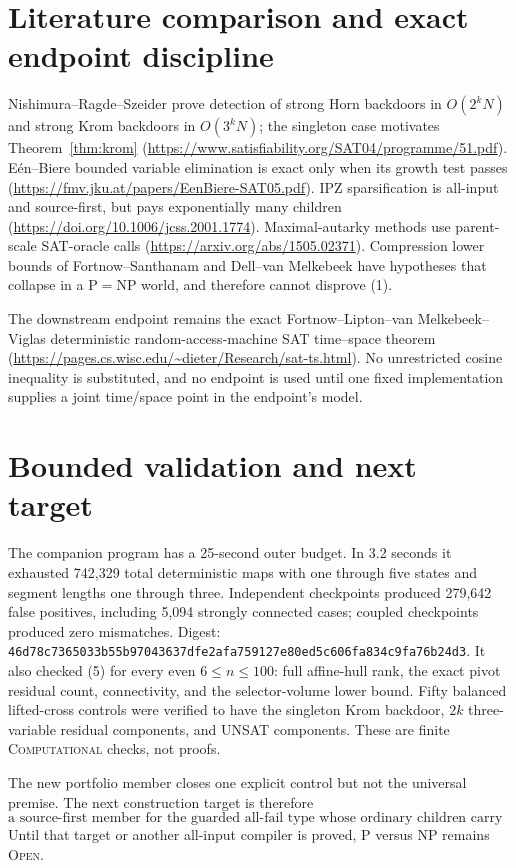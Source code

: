 \documentclass[11pt]{article}
\begin{document}
\section{Literature comparison and exact endpoint discipline}
Nishimura--Ragde--Szeider prove detection of strong Horn backdoors in
$O(2^kN)$ and strong Krom backdoors in $O(3^kN)$; the singleton case
motivates Theorem~\ref{thm:krom}
(\url{https://www.satisfiability.org/SAT04/programme/51.pdf}).
E\'en--Biere bounded variable elimination is exact only when its growth test
passes (\url{https://fmv.jku.at/papers/EenBiere-SAT05.pdf}).  IPZ
sparsification is all-input and source-first, but pays exponentially many
children (\url{https://doi.org/10.1006/jcss.2001.1774}).  Maximal-autarky
methods use parent-scale SAT-oracle calls
(\url{https://arxiv.org/abs/1505.02371}).  Compression lower bounds of
Fortnow--Santhanam and Dell--van Melkebeek have hypotheses that collapse in a
$\mathrm P=\mathrm{NP}$ world, and therefore cannot disprove (1).

The downstream endpoint remains the exact Fortnow--Lipton--van
Melkebeek--Viglas deterministic random-access-machine SAT time--space
theorem (\url{https://pages.cs.wisc.edu/~dieter/Research/sat-ts.html}).
No unrestricted cosine inequality is substituted, and no endpoint is used
until one fixed implementation supplies a joint time/space point in the
endpoint's model.

\section{Bounded validation and next target}
The companion program has a 25-second outer budget.  In 3.2 seconds it
exhausted 742,329 total deterministic maps with one through five states and
segment lengths one through three.  Independent checkpoints produced
279,642 false positives, including 5,094 strongly connected cases; coupled
checkpoints produced zero mismatches.  Digest:
\texttt{46d78c7365033b55b97043637dfe2afa759127e80ed5c606fa834c9fa76b24d3}.
It also checked (5) for every even $6\le n\le100$: full affine-hull rank,
the exact pivot residual count, connectivity, and the selector-volume lower
bound.  Fifty balanced lifted-cross controls were verified to have the
singleton Krom backdoor, $2k$ three-variable residual components, and UNSAT
components.  These are finite \textsc{Computational} checks, not proofs.

The new portfolio member closes one explicit control but not the universal
premise.  The next construction target is therefore
\[
 \boxed{\text{a source-first member for the guarded all-fail type whose
 ordinary children carry charged successor certificates.}}
\]
Until that target or another all-input compiler is proved, P versus NP
remains \textsc{Open}.

\end{document}
